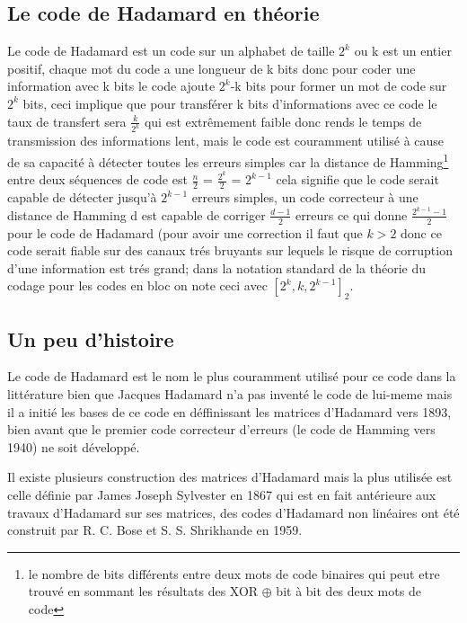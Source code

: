 \documentclass{article}
\begin{document}
\subsection{Le code de Hadamard en théorie}

Le code de Hadamard est un code sur un alphabet de taille $2^k$ ou k est un
entier positif, chaque mot du code a une longueur de k bits donc pour coder
une information avec k bits le code ajoute $2^k$-k bits pour former un mot
de code sur $2^k$ bits, ceci implique que pour transférer k bits 
d'informations avec ce code le taux de transfert sera $\frac{k}{2^k}$ qui
est extrêmement faible donc rends le temps de transmission des informations
lent, mais le code est couramment utilisé à cause de sa capacité à détecter
toutes les erreurs simples car la distance de Hamming\footnote{le nombre 
de bits différents entre deux mots de code binaires qui peut etre trouvé en
sommant les résultats des XOR $\oplus$ bit à bit des deux mots de code} entre deux séquences de 
code est $\frac{n}{2}$ = $\frac{2^k}{2}$ = $2^{k-1}$ cela 
signifie que le code serait capable de détecter jusqu'à $2^{k-1}$ erreurs 
simples, un code correcteur à une distance de Hamming d est capable de 
corriger $\frac{d-1}{2}$ erreurs ce qui donne $\frac{2^{k-1}-1}{2}$ pour le
code de Hadamard (pour avoir une correction il faut que $k>2$ donc ce code 
serait fiable sur des canaux trés bruyants sur lequels le risque de 
corruption d'une information est trés grand; dans la notation standard de 
la théorie du codage pour les codes en bloc on note ceci avec 
$[2^k, k, 2^{k-1}]_2$.

\subsection{Un peu d'histoire}

Le code de Hadamard est le nom le plus couramment utilisé pour ce code dans
la littérature bien que Jacques Hadamard n'a pas inventé le code de 
lui-meme mais il a initié les bases de ce code en déffinissant les matrices
d'Hadamard vers 1893, bien avant que le premier code correcteur d'erreurs
(le code de Hamming vers 1940) ne soit développé.

Il existe plusieurs construction des matrices d'Hadamard mais la plus 
utilisée est celle définie par James Joseph Sylvester en 1867 qui est en 
fait antérieure aux travaux d'Hadamard sur ses matrices, des codes 
d'Hadamard non linéaires ont été construit par R. C. Bose et S. S. 
Shrikhande en 1959.
\end{document}
